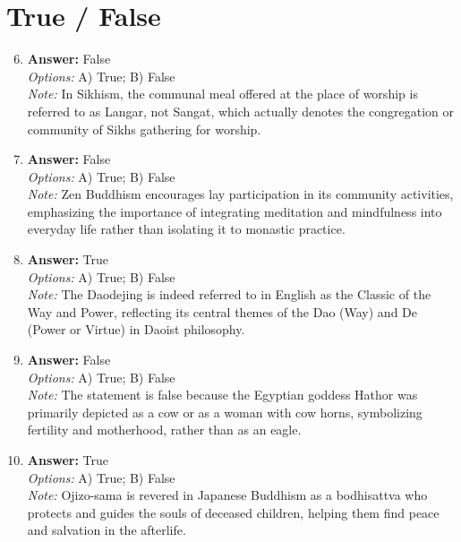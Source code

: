 \documentclass[12pt]{article}
\begin{document}
\section*{True / False}
\begin{enumerate}[label=\arabic*.]
\setcounter{enumi}{5}
\item \textbf{Answer:} False
\\ \textit{Options:} A) True; B) False
\\ \textit{Note:} In Sikhism, the communal meal offered at the place of worship is referred to as Langar, not Sangat, which actually denotes the congregation or community of Sikhs gathering for worship.
\item \textbf{Answer:} False
\\ \textit{Options:} A) True; B) False
\\ \textit{Note:} Zen Buddhism encourages lay participation in its community activities, emphasizing the importance of integrating meditation and mindfulness into everyday life rather than isolating it to monastic practice.
\item \textbf{Answer:} True
\\ \textit{Options:} A) True; B) False
\\ \textit{Note:} The Daodejing is indeed referred to in English as the Classic of the Way and Power, reflecting its central themes of the Dao (Way) and De (Power or Virtue) in Daoist philosophy.
\item \textbf{Answer:} False
\\ \textit{Options:} A) True; B) False
\\ \textit{Note:} The statement is false because the Egyptian goddess Hathor was primarily depicted as a cow or as a woman with cow horns, symbolizing fertility and motherhood, rather than as an eagle.
\item \textbf{Answer:} True
\\ \textit{Options:} A) True; B) False
\\ \textit{Note:} Ojizo-sama is revered in Japanese Buddhism as a bodhisattva who protects and guides the souls of deceased children, helping them find peace and salvation in the afterlife.
\end{enumerate}
\end{document}
